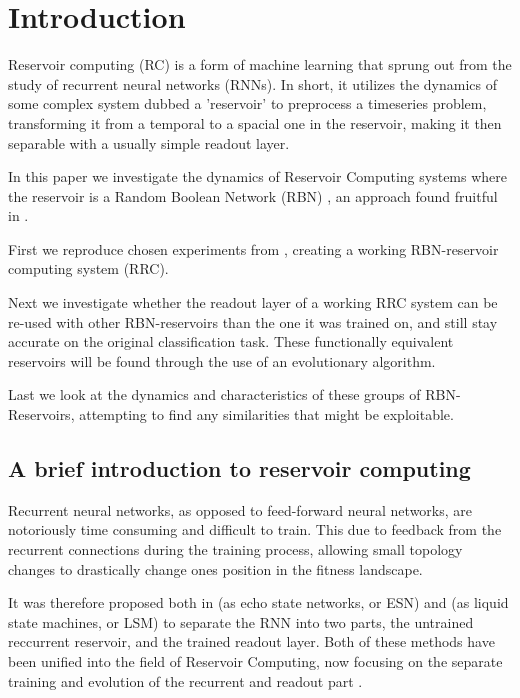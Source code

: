 \section{Introduction}

Reservoir computing (RC) is a form of machine learning that sprung out from the study of recurrent neural networks (RNNs).
In short, it utilizes the dynamics of some complex system dubbed a 'reservoir' to preprocess a timeseries problem,
transforming it from a temporal to a spacial one in the reservoir, making it then separable with a usually simple readout layer.

In this paper we investigate the dynamics of Reservoir Computing systems where the reservoir is a Random Boolean Network (RBN) \cite{gershenson2004introduction},
an approach found fruitful in \cite{rbn-reservoir}.

First we reproduce chosen experiments from \cite{rbn-reservoir}, creating a working RBN-reservoir computing system (RRC).

Next we investigate whether the readout layer of a working RRC system can be re-used with other RBN-reservoirs than the one it was trained on,
and still stay accurate on the original classification task.
These functionally equivalent reservoirs will be found through the use of an evolutionary algorithm.

Last we look at the dynamics and characteristics of these groups of RBN-Reservoirs, attempting to find any similarities that might be exploitable.

\subsection{A brief introduction to reservoir computing}

Recurrent neural networks, as opposed to feed-forward neural networks,
are notoriously time consuming and difficult to train.
This due to feedback from the recurrent connections during the training process,
allowing small topology changes to drastically change ones position in the fitness landscape.

It was therefore proposed both in \cite{jaeger2002adaptive} (as echo state networks, or ESN)
and \cite{natschlager2002liquid} (as liquid state machines, or LSM) to separate the RNN into two parts,
the untrained reccurrent reservoir, and the trained readout layer.
Both of these methods have been unified into the field of Reservoir Computing,
now focusing on the separate training and evolution of the recurrent and readout part \cite{lukovsevivcius2012reservoir}.

